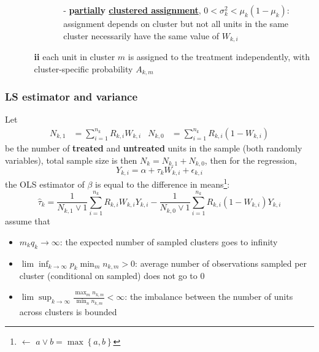 \documentclass[twoside]{article}
\begin{document}
\begin{itemize}
\begin{itemize}
\begin{itemize}
\begin{itemize}
                \item[-] \textbf{p\underline{artiall}y \underline{clustered assi}g\underline{nment}}, $0<\sigma^2_k< \mu_k(1-\mu_k)$: assignment depends on cluster but not all units in the same cluster necessarily have the same value of $W_{k,i}$
            \end{itemize}
        \end{itemize}
        \item[\textbf{ii}] each unit in cluster $m$ is assigned to the treatment independently, with cluster-specific probability $A_{k,m}$
    \end{itemize}
\end{itemize}

\subsubsection{LS estimator and variance}
Let 
\begin{align*}
    N_{k,1} &= \sum^{n_k}_{i=1}R_{k,i}W_{k,i} & N_{k,0} &= \sum^{n_k}_{i=1} R_{k,i} (1-W_{k,i})
\end{align*}
be the number of \textbf{treated} and \textbf{untreated} units in the sample (both randomly variables), total sample size is then $N_k=N_{k,1}+N_{k,0}$, then for the regression, 
$$
Y_{k,i} = \alpha + \tau_k W_{k,i} + \epsilon_{k,i}
$$
the OLS estimator of $\beta$ is equal to the difference in means\footnote{$\leftarrow$ $a\vee b = \max\left\{a,b\right\}$}:
\begin{equation*}
    \hat{\tau}_k = \frac{1}{N_{k,1}\vee 1}\sum^{n_k}_{i=1}R_{k,i}W_{k,i}Y_{k,i} - \frac{1}{N_{k,0}\vee 1}\sum^{n_k}_{i=1}R_{k,i}(1-W_{k,i})Y_{k,i}
\end{equation*}
\citet{abadie2023should} assume that 
\begin{itemize}
    \item $m_kq_k\rightarrow \infty$: the expected number of sampled clusters goes to infinity
    \item $\lim\inf_{k\rightarrow \infty} p_k \min_m n_{k,m} > 0 $: average number of observations sampled per cluster (conditional on sampled) does not go to 0
    \item $\lim \sup_{k\rightarrow \infty} \frac{\max_m n_{k,m}}{\min_n n_{k,m}} < \infty$: the imbalance between the number of units across clusters is bounded
\end{itemize}
\end{document}
